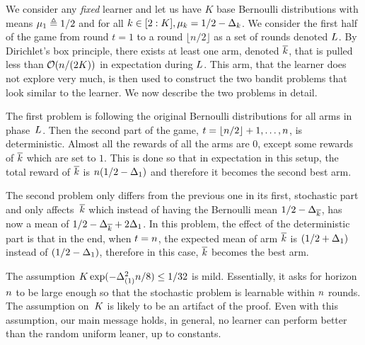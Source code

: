 We consider any \emph{fixed} learner and let us have $K$ base Bernoulli distributions with  
means $\mu_1 \triangleq 1/2$ and for all $k\in[2:K], \mu_k=1/2-\Delta_k$. 
We consider the first half of the game from round $t=1$ 
to a round 
$\lfloor n/2\rfloor$ as a  set of rounds denoted 
$L$. 
By Dirichlet's box principle, 
there exists at least one  arm, denoted $\overline k$,
that is pulled less than $\mathcal{O}(n/(2K))$ in 
expectation during $L$. This arm, that the learner 
does not explore very much, is then used to 
construct the two bandit problems that look similar to the learner. 
We now describe the two problems in detail.

The first problem  is  following the 
original Bernoulli distributions for all arms in phase~$L$.
Then the second part of the game, $t=\lfloor n/2\rfloor+1,
\ldots,n$, is deterministic.  Almost all the 
rewards of all the arms are $0$, except some rewards of 
$\overline k$ which are set to $1$. This is done so that in 
expectation in this setup, the total reward of $\overline k$ 
is $n(1/2-\Delta_1)$ and therefore it becomes the second
best arm. %

The second problem only differs from the previous one 
in its first, stochastic  part and only affects~$\overline k$ which instead of 
having the Bernoulli mean $1/2-\Delta_{\overline k}$,  has now 
a mean 
of $1/2-\Delta_{\overline k}+2\Delta_{1}$. In this problem, 
the effect of the deterministic part is that in the end, 
when $t=n$, the expected mean of  arm 
$\overline k$ is 
$(1/2+\Delta_1)$ instead of $(1/2-\Delta_1)$, therefore in this case, 
$\overline k$ becomes the best arm.
%
%
\begin{remark}
	The assumption $K\exp(-\Delta^2_{(1)}
	n/8)\leq 1/32$ is mild. 
	Essentially, it  asks for horizon $n$ to be 
	large 
	enough so that the stochastic problem is learnable within 
	$n$ rounds. The assumption on~$K$ is 
	likely to be an artifact of the proof. Even with this 
	assumption, our main message holds, in general, 
	no learner can perform better than the random uniform leaner, up to constants.
\end{remark}%